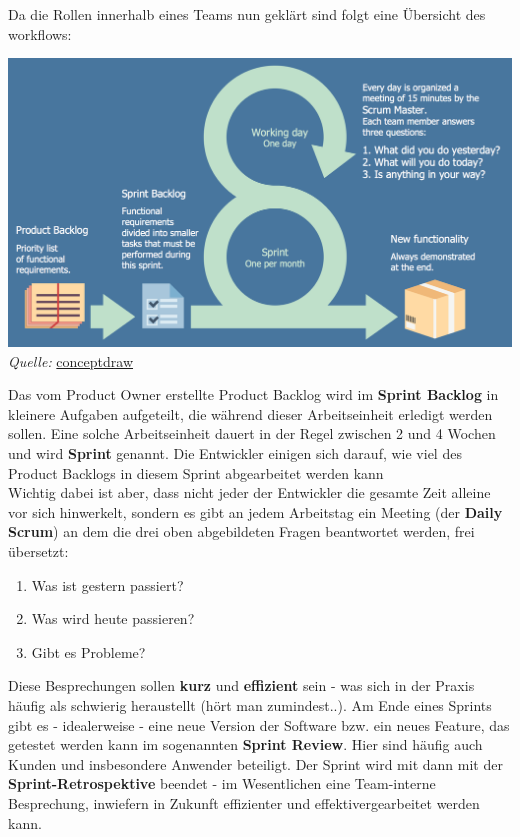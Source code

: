 \documentclass{article}
\begin{document}
Da die Rollen innerhalb eines Teams nun geklärt sind folgt eine Übersicht des workflows: 
\begin{center}
    \includegraphics[scale=0.25]{../media/scrum-workflow.png} \\
    \textit{Quelle:} \href{https://www.conceptdraw.com/How-To-Guide/scrum-workflow}{conceptdraw}
\end{center}
Das vom Product Owner erstellte Product Backlog wird im \textbf{Sprint Backlog} in kleinere Aufgaben aufgeteilt, die während dieser Arbeitseinheit erledigt werden sollen. Eine solche Arbeitseinheit dauert in der Regel zwischen 2 und 4 Wochen und wird \textbf{Sprint} genannt. Die Entwickler einigen sich darauf, wie viel des Product Backlogs in diesem Sprint abgearbeitet werden kann  \\
Wichtig dabei ist aber, dass nicht jeder der Entwickler die gesamte Zeit alleine vor sich hinwerkelt, sondern es gibt an jedem Arbeitstag ein Meeting (der \textbf{Daily Scrum}) an dem die drei oben abgebildeten Fragen beantwortet werden, frei übersetzt:
\begin{enumerate}
    \item Was ist gestern passiert?
    \item Was wird heute passieren?
    \item Gibt es Probleme?
\end{enumerate}
Diese Besprechungen sollen \textbf{kurz} und \textbf{effizient} sein - was sich in der Praxis häufig als schwierig heraustellt (hört man zumindest..). Am Ende eines Sprints gibt es - idealerweise - eine neue Version der Software bzw. ein neues Feature, das getestet werden kann im sogenannten \textbf{Sprint Review}. Hier sind häufig auch Kunden und insbesondere Anwender beteiligt. Der Sprint wird mit dann mit der \textbf{Sprint-Retrospektive} beendet - im Wesentlichen eine Team-interne Besprechung, inwiefern in Zukunft effizienter und effektivergearbeitet werden kann. \\
\end{document}
